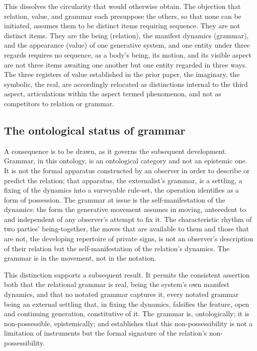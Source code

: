 \noindent
This dissolves the circularity that would otherwise obtain. The objection that relation, value, and grammar each presuppose the others, so that none can be initiated, assumes them to be distinct items requiring sequence. They are not distinct items. They are the being (relation), the manifest dynamics (grammar), and the appearance (value) of one generative system, and one entity under three regards requires no sequence, as a body's being, its motion, and its visible aspect are not three items awaiting one another but one entity regarded in three ways. The three registers of value established in the prior paper, the imaginary, the symbolic, the real, are accordingly relocated as distinctions internal to the third aspect, articulations within the aspect termed phenomenon, and not as competitors to relation or grammar.

\subsection{The ontological status of grammar}
\label{p10:sec:grammar-ontological}

A consequence is to be drawn, as it governs the subsequent development. Grammar, in this ontology, is an ontological category and not an epistemic one. It is not the formal apparatus constructed by an observer in order to describe or predict the relation; that apparatus, the externalist's grammar, is a settling, a fixing of the dynamics into a surveyable rule-set, the operation  identifies as a form of possession. The grammar at issue is the self-manifestation of the dynamics: the form the generative movement assumes in moving, antecedent to and independent of any observer's attempt to fix it. The characteristic rhythm of two parties' being-together, the moves that are available to them and those that are not, the developing repertoire of private signs, is not an observer's description of their relation but the self-manifestation of the relation's dynamics. The grammar is in the movement, not in the notation.

This distinction supports a subsequent result. It permits the consistent assertion both that the relational grammar is real, being the system's own manifest dynamics, and that no notated grammar captures it, every notated grammar being an external settling that, in fixing the dynamics, falsifies the feature, open and continuing generation, constitutive of it. The grammar is, ontologically; it is non-possessible, epistemically; and  establishes that this non-possessibility is not a limitation of instruments but the formal signature of the relation's non-possessibility.


